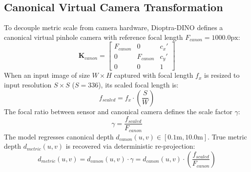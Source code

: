 \documentclass[10pt,twocolumn,letterpaper]{article}
\begin{document}
\subsection{Canonical Virtual Camera Transformation}
To decouple metric scale from camera hardware, Dioptra-DINO defines a canonical virtual pinhole camera with reference focal length $F_{canon} = 1000.0\text{px}$:
\begin{equation}
\mathbf{K}_{canon} = \begin{bmatrix} F_{canon} & 0 & c_x' \\ 0 & F_{canon} & c_y' \\ 0 & 0 & 1 \end{bmatrix}
\end{equation}
When an input image of size $W \times H$ captured with focal length $f_x$ is resized to input resolution $S \times S$ ($S=336$), its scaled focal length is:
\begin{equation}
f_{scaled} = f_x \cdot \left(\frac{S}{W}\right)
\end{equation}
The focal ratio between sensor and canonical camera defines the scale factor $\gamma$:
\begin{equation}
\gamma = \frac{f_{scaled}}{F_{canon}}
\end{equation}
The model regresses canonical depth $d_{canon}(u, v) \in [0.1\text{m}, 10.0\text{m}]$. True metric depth $d_{metric}(u, v)$ is recovered via deterministic re-projection:
\begin{equation}
d_{metric}(u, v) = d_{canon}(u, v) \cdot \gamma = d_{canon}(u, v) \cdot \left(\frac{f_{scaled}}{F_{canon}}\right)
\end{equation}
\end{document}
